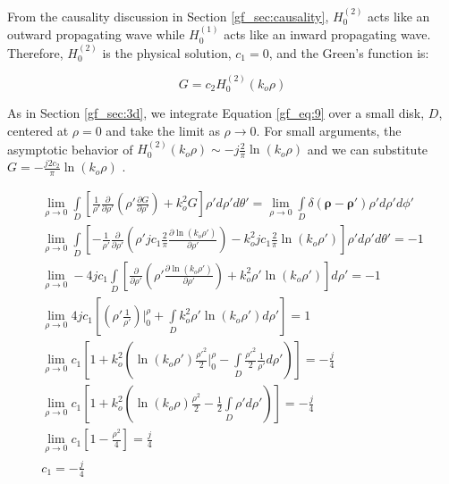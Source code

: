 From the causality discussion in Section \ref{gf_sec:causality}, $H_0^{(2)}$ acts like an outward propagating wave while $H_0^{(1)}$ acts like an inward propagating wave. Therefore, $H_0^{(2)}$ is the physical solution, $c_1=0$, and the Green's function is:

\begin{equation}
G = c_2H_0^{(2)}\left(k_o\rho\right) 
\label{gf_eq:38}
\end{equation}
\renewcommand{\baselinestretch}{2} \small\normalsize

As in Section \ref{gf_sec:3d}, we integrate Equation \ref{gf_eq:9} over a small disk, $D$, centered at $\rho = 0$ and take the limit as $\rho \rightarrow 0$. For small arguments, the asymptotic behavior of $H_0^{(2)}(k_o\rho) \sim -j\frac{2}{\pi}\ln\left({k_o\rho}\right)$ and we can substitute $G = -\frac{j2c_2}{\pi}\ln\left({k_o\rho}\right)$ \cite{abramowitz_stegun}. 

\begin{equation}
\begin{gathered}
\lim_{\rho\to 0}\int\limits_{D} \left[ \frac{1}{\rho'}\frac{\partial}{\partial \rho'}\left(\rho' \frac{\partial G}{\partial \rho'} \right) + k_o^2G\right]\rho' d\rho' d\theta' = \lim_{\rho\to 0}\int\limits_{D} \delta\left(\boldsymbol{\rho}-\boldsymbol{\rho}' \right)\rho' d\rho' d\phi' \\
\lim_{\rho\to 0}\int\limits_{D} \left[ -\frac{1}{\rho'}\frac{\partial}{\partial \rho'}\left(\rho' jc_1\frac{2}{\pi}\frac{\partial \ln(k_o\rho')}{\partial \rho'} \right) - k_o^2jc_1\frac{2}{\pi}\ln(k_o\rho')\right]\rho' d\rho' d\theta' = -1 \\
\lim_{\rho\to 0}-4jc_1\int\limits_{D} \left[\frac{\partial}{\partial \rho'}\left(\rho' \frac{\partial \ln(k_o\rho')}{\partial \rho'} \right) + k_o^2\rho'\ln(k_o\rho')\right] d\rho' = -1 \\
\lim_{\rho\to 0}4jc_1\left[\left(\rho' \frac{1 }{\rho'} \right)\bigg|_0^{\rho} + \int\limits_{D}k_o^2\rho'\ln(k_o\rho') d\rho'\right] = 1 \\
\lim_{\rho\to 0}c_1\left[ 1 +  k_o^2\left( \ln(k_o\rho')\frac{\rho'^2}{2}\bigg|_0^{\rho} - \int\limits_{D}\frac{\rho'^2}{2}\frac{1}{\rho'} d\rho' \right)\right] = -\frac{j}{4} \\
\lim_{\rho\to 0}c_1\left[ 1 +  k_o^2\left( \ln(k_o\rho)\frac{\rho^2}{2} - \frac{1}{2}\int\limits_{D}\rho' d\rho' \right)\right] = -\frac{j}{4} \\
\lim_{\rho\to 0}c_1\left[ 1 - \frac{\rho^2}{4}\right] = \frac{j}{4} \\
c_1 = -\frac{j}{4}
\end{gathered}
\label{gf_eq:39}
\end{equation}
\renewcommand{\baselinestretch}{2} \small\normalsize


